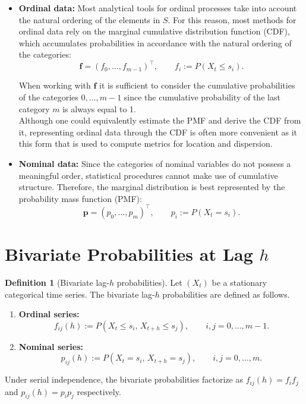 ﻿\documentclass[12pt,a4paper]{scrreprt}
\theoremstyle{definition}
\newtheorem{definition}[theorem]{Definition}
\begin{document}
\begin{itemize}
    \item \textbf{Ordinal data:}
    Most analytical tools for ordinal processes take into account the natural ordering of the elements in $S$. For this reason, most methods for ordinal data rely on the marginal cumulative distribution function (CDF), which accumulates probabilities in accordance with the natural ordering of the categories:
    \[
        \boldsymbol{f} = (f_0, \dots, f_{m-1})^\top,
        \qquad
        f_i := P(X_t \le s_i).
    \]

    When working with $\boldsymbol{f}$ it is sufficient to consider the cumulative probabilities of the categories $0, \ldots , m-1$ since the cumulative probability of the last category $m$ is always equal to 1. \\

    Although one could equivalently estimate the PMF and derive the CDF from it, representing ordinal data through the CDF is often more convenient as it this form that is used to compute metrics for location and dispersion.

    \item \textbf{Nominal data:}
    Since the categories of nominal variables do not possess a meaningful order, statistical procedures cannot make use of cumulative structure.
    Therefore, the marginal distribution is best represented by the probability mass function (PMF):
    \[
        \boldsymbol{p} = (p_0, \dots, p_{m})^\top,
        \qquad
        p_i := P(X_t = s_i).
    \]
\end{itemize}


\section{Bivariate Probabilities at Lag $h$}

\begin{definition}[Bivariate lag-$h$ probabilities]
\label{def:biv_probs}
Let $(X_t)$ be a stationary categorical time series. The bivariate lag-$h$ 
probabilities are defined as follows.
\begin{enumerate}
    \item[\normalfont(i)] \textbf{Ordinal series:}
    \[
    f_{ij}(h) := P(X_t \le s_i,\, X_{t+h} \le s_j), \qquad i,j = 0,\ldots, m-1.
    \]
    \item[\normalfont(ii)] \textbf{Nominal series:}
    \[
    p_{ij}(h) := P(X_t = s_i,\, X_{t+h} = s_j), \qquad i,j = 0,\ldots, m.
    \]
\end{enumerate}
Under serial independence, the bivariate probabilities factorize as 
$f_{ij}(h) = f_i f_j$ and $p_{ij}(h) = p_ip_j$ respectively.
\end{definition}
\end{document}
